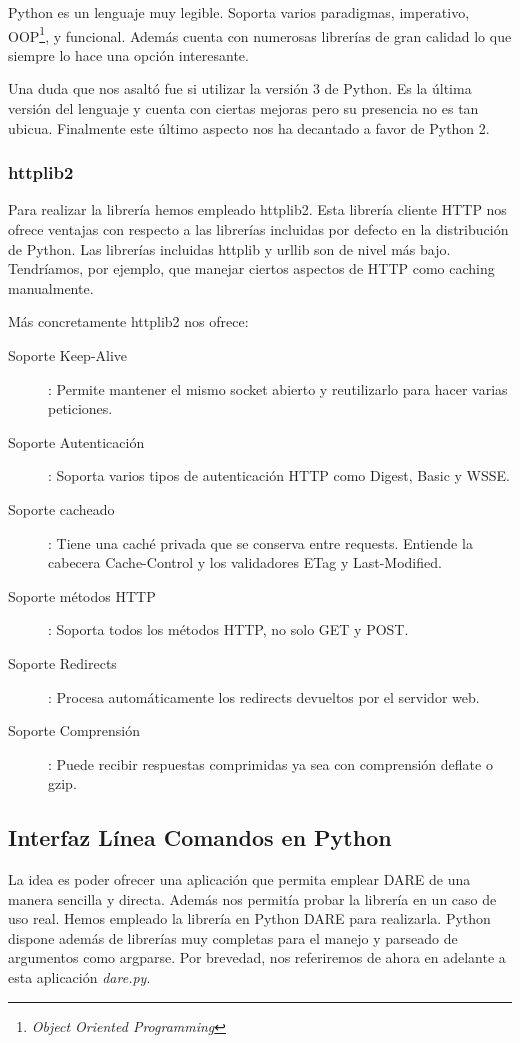 Python es un lenguaje muy legible. Soporta varios paradigmas,
imperativo, OOP\footnote{\emph{Object Oriented Programming}}, y
funcional. Además cuenta con numerosas librerías de gran calidad lo
que siempre lo hace una opción interesante.

Una duda que nos asaltó fue si utilizar la versión 3 de Python. Es la
última versión del lenguaje y cuenta con ciertas mejoras pero su
presencia no es tan ubicua. Finalmente este último aspecto nos ha
decantado a favor de Python 2.

\subsubsection{httplib2}

Para realizar la librería hemos empleado httplib2. Esta librería
cliente HTTP nos ofrece ventajas con respecto a las librerías
incluidas por defecto en la distribución de Python. Las librerías
incluidas httplib y urllib son de nivel más bajo. Tendríamos, por
ejemplo, que manejar ciertos aspectos de HTTP como caching
manualmente.

Más concretamente httplib2 nos ofrece:
\begin{description}
  \item[Soporte Keep-Alive]: Permite mantener el mismo socket abierto
    y reutilizarlo para hacer varias peticiones.
  \item[Soporte Autenticación]: Soporta varios tipos de
    autenticación HTTP como Digest, Basic y WSSE.
  \item[Soporte cacheado]: Tiene una caché privada que se conserva
    entre requests. Entiende la cabecera Cache-Control y los
    validadores ETag y Last-Modified.
  \item[Soporte métodos HTTP]: Soporta todos los métodos HTTP, no solo
    GET y POST.
  \item[Soporte Redirects]: Procesa automáticamente los redirects
    devueltos por el servidor web.
  \item[Soporte Comprensión]: Puede recibir respuestas comprimidas ya
    sea con comprensión deflate o gzip.
\end{description}

\subsection{Interfaz Línea Comandos en Python}

La idea es poder ofrecer una aplicación que permita emplear DARE de
una manera sencilla y directa. Además nos permitía probar la librería
en un caso de uso real. Hemos empleado la librería en Python DARE para
realizarla. Python dispone además de librerías muy completas para el
manejo y parseado de argumentos como argparse. Por brevedad, nos
referiremos de ahora en adelante a esta aplicación \emph{dare.py}.


